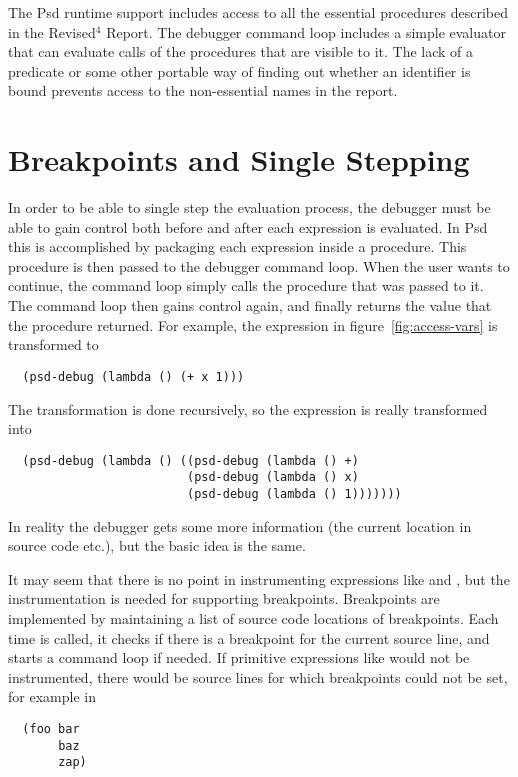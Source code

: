 The Psd runtime support includes access to all the essential
procedures
  described in the Revised${}^4$ Report. The debugger command
loop includes a simple evaluator that can evaluate calls of the
procedures that are visible to it. The lack of a 
predicate or some other portable way of finding out whether an
identifier is bound prevents access to the non-essential names in the
report.

\section{Breakpoints and Single Stepping}
\label{sec:breakpoints}

In order to be able to single step the evaluation process, the
debugger must be able to gain control both before and after each
expression is evaluated. In Psd this is accomplished by packaging each
expression inside a procedure. This procedure is then passed to the
debugger command loop. When the user wants to continue, the command
loop simply calls the procedure that was passed to it. The command
loop then gains control again, and finally returns the value that the
procedure returned. For example, the expression
 in figure~\ref{fig:access-vars} is transformed to
\begin{verbatim}
  (psd-debug (lambda () (+ x 1)))
\end{verbatim}

The transformation is done recursively, so the expression
is really transformed into
\begin{verbatim}
  (psd-debug (lambda () ((psd-debug (lambda () +)
                         (psd-debug (lambda () x)
                         (psd-debug (lambda () 1)))))))
\end{verbatim}
In reality the debugger gets some more information (the current
location in source code etc.), but the basic idea is the same.

It may seem that there is no point in instrumenting expressions like
\scheme{+} and , but the instrumentation is needed for
supporting breakpoints. Breakpoints are implemented by maintaining a
list of source code locations of breakpoints. Each time
 is called, it checks if there is a breakpoint for
the current source line, and starts a command loop if needed. If
primitive expressions like  would not be instrumented, there
would be source lines for which breakpoints could not be set, for
example in
\begin{verbatim}
  (foo bar
       baz
       zap)
\end{verbatim}

